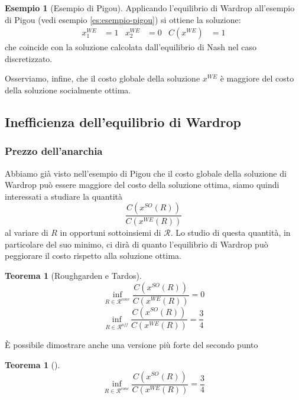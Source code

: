 \documentclass[a4paper]{article}
\newcounter{counter1}
\theoremstyle{plain}
\newtheorem{myteo}[counter1]{Teorema}
\theoremstyle{definition}
\newtheorem{myes}[counter1]{Esempio}
\theoremstyle{remark}
\newcommand{\pa}[1]{\left(#1\right)}
\begin{document}
\begin{myes}[Esempio di Pigou]
  Applicando l'equilibrio di Wardrop all'esempio di Pigou (vedi
  esempio \ref{es:esempio-pigou}) si ottiene la soluzione:
  \begin{align*}
    x^{WE}_1 &= 1 & x^{WE}_2 &= 0 & C\pa{x^{WE}} &= 1
  \end{align*}
  che coincide con la soluzione calcolata dall'equilibrio di Nash nel
  caso discretizzato.

  Osserviamo, infine, che il costo globale della soluzione $x^{WE}$ è
  maggiore del costo della soluzione socialmente ottima.
\end{myes}

\subsection{Inefficienza dell'equilibrio di Wardrop}
\label{sec:wardrop-inefficienza}

\subsubsection{Prezzo dell'anarchia}
\label{sec:wardrop-poa}

Abbiamo già visto nell'esempio di Pigou che il costo globale della
soluzione di Wardrop può essere maggiore del costo della soluzione
ottima, siamo quindi interessati a studiare la quantità
\[ \frac{C\pa{x^{SO}\pa{R}}}{C\pa{x^{WE}\pa{R}}} \]
al variare di $R$ in opportuni sottoinsiemi di $\mathcal{R}$. Lo
studio di questa quantità, in particolare del suo minimo, ci dirà di
quanto l'equilibrio di Wardrop può peggiorare il costo rispetto alla
soluzione ottima.

\begin{myteo}[Roughgarden e Tardos{\cite[Teorema
    4.5]{roughgarden2002}}]
\label{teo:roughgarden-tardos}
  \[ \inf _{R\in \mathcal{R}^{conv}} \frac{C\pa{ x^{SO}\pa{R}}}{C\pa{
        x^{WE}\pa{R}}} = 0 \]
  \[ \inf _{R\in \mathcal{R}^{aff}} \frac{C\pa{ x^{SO}\pa{R}}}{C\pa{
        x^{WE}\pa{R}}} = \frac{3}{4} \]
\end{myteo}

È possibile dimostrare anche una versione più forte del secondo punto
\begin{myteo}[{\cite[Lemma 3.10]{menache2011network}}]
\label{teo:poa-we-conc}
  \[ \inf _{R\in \mathcal{R}^{conc}} \frac{C\pa{ x^{SO}\pa{R}}}{C\pa{
        x^{WE}\pa{R}}} = \frac{3}{4} \]
\end{myteo}
\end{document}
